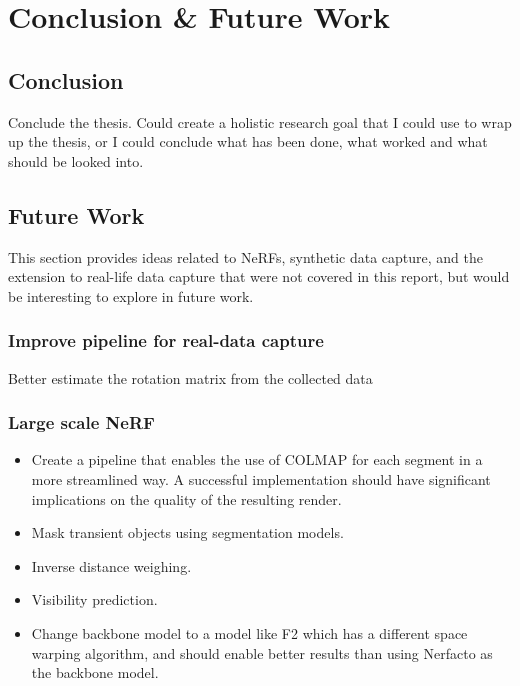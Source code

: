 \chapter{Conclusion \& Future Work}

\section{Conclusion}
Conclude the thesis. Could create a holistic research goal that I could use to wrap up the thesis, or I could conclude what has been done, what worked and what should be looked into.



















\section{Future Work}
This section provides ideas related to NeRFs, synthetic data capture, and the extension to real-life data capture that were not covered in this report, but would be interesting to explore in future work.

\subsection{Improve pipeline for real-data capture}
Better estimate the rotation matrix from the collected data

\subsection{Large scale NeRF}
\begin{comment}
- Create a pipeline that enables the use of COLMAP for each segment in a more streamlined way. A succesful implementation should have significant implications on the quality of the resulting render.
- Mask transient objects using segmentation models
- Inverse distance weighing
- Visibility prediction
- Change backbone model to a model like F2 which have a different space warping algorithm, and should enable better results than using Nerfacto as the backbone model.
\end{comment}

\begin{itemize}
    \item Create a pipeline that enables the use of COLMAP for each segment in a more streamlined way. A successful implementation should have significant implications on the quality of the resulting render.
    \item Mask transient objects using segmentation models.
    \item Inverse distance weighing.
    \item Visibility prediction.
    \item Change backbone model to a model like F2 which has a different space warping algorithm, and should enable better results than using Nerfacto as the backbone model.
\end{itemize}